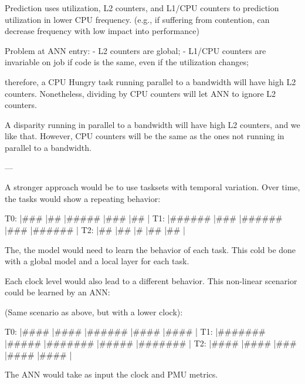 Prediction uses utilization, L2 counters, and L1/CPU counters to prediction utilization in lower CPU frequency. (e.g., if suffering from contention, can decrease frequency with low impact into performance)

Problem at ANN entry:
- L2 counters are global;
- L1/CPU counters are invariable on job if code is the same, even if the utilization changes;

therefore, a CPU Hungry task running parallel to a bandwidth will have high L2 counters. Nonetheless, dividing by CPU counters will let ANN to ignore L2 counters.

A disparity running in parallel to a bandwidth will have high L2 counters, and we like that. However, CPU counters will be the same as the ones not running in parallel to a bandwidth.

---

A stronger approach would be to use tasksets with temporal variation. Over time, the tasks would show a repeating behavior:

T0: |###       |##        |#####     |###       |##        |
T1: |######    |###       |######    |###       |######    |
T2: |##        |##        |#         |##        |##        |

The, the model would need to learn the behavior of each task. This cold be done with a global model and a local layer for each task.

Each clock level would also lead to a different behavior. This non-linear scenarior could be learned by an ANN:

(Same scenario as above, but with a lower clock):

T0: |####      |####      |######    |####      |####      |
T1: |#######   |#####     |#######   |#####     |#######   |
T2: |####      |####      |###       |####      |####      |

The ANN would take as input the clock and PMU metrics.

